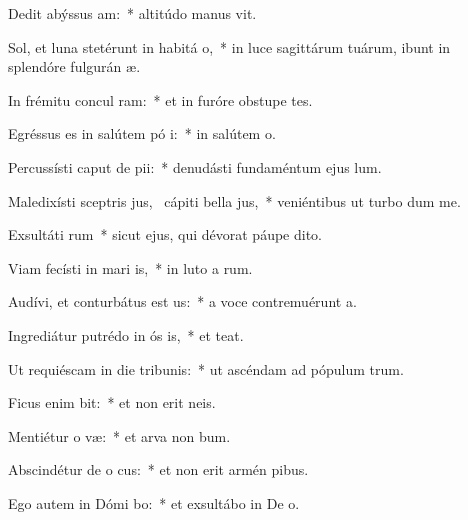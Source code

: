 \item Dedit abýssus  am:~* altitúdo manus  vit.
\item Sol, et luna stetérunt in habitá o,~* in luce sagittárum tuárum, ibunt in splendóre fulgurán  æ.
\item In frémitu concul ram:~* et in furóre obstupe tes.
\item Egréssus es in salútem pó i:~* in salútem   o.
\item Percussísti caput de  pii:~* denudásti fundaméntum ejus   lum.
\item Maledixísti sceptris jus,~\pscross{} cápiti bella jus,~* veniéntibus ut turbo  dum me.
\item Exsultáti rum~* sicut ejus, qui dévorat páupe  dito.
\item Viam fecísti in mari  is,~* in luto a rum.
\item Audívi, et conturbátus est  us:~* a voce contremuérunt  a.
\item Ingrediátur putrédo in ós is,~* et   teat.
\item Ut requiéscam in die tribunis:~* ut ascéndam ad pópulum  trum.
\item Ficus enim  bit:~* et non erit   neis.
\item Mentiétur o væ:~* et arva non  bum.
\item Abscindétur de o cus:~* et non erit armén  pibus.
\item Ego autem in Dómi bo:~* et exsultábo in De  o.
